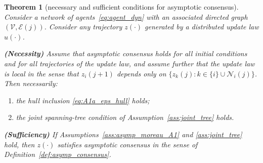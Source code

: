 \documentclass[10pt,a4paper]{amsart}
\newtheorem{theorem}{Theorem}
\begin{document}
\begin{theorem}[necessary and sufficient conditions for asymptotic consensus]
\label{thm:moreau_nes_suf}
Consider a network of agents~\eqref{eq:agent_dyn} with an associated directed graph $(\mathcal{V},\mathcal{E}(j))$.
Consider any trajectory $z(\cdot)$ generated by a distributed update law $u(\cdot)$.

\smallskip
\noindent\textbf{(Necessity)}  
Assume that asymptotic consensus holds for all initial conditions and for all trajectories of the update law,
and assume further that the update law is \emph{local} in the sense that $z_i(j+1)$ depends only on
$\{z_k(j):k\in\{i\}\cup\mathcal N_i(j)\}$.
Then necessarily:
\begin{enumerate}
\item[\textbf{(N1)}] the hull inclusion \eqref{eq:A1a_eps_hull} holds;
\item[\textbf{(N2)}] the joint spanning-tree condition of Assumption~\ref{ass:joint_tree} holds.
\end{enumerate}
\smallskip
\noindent\textbf{(Sufficiency)}  
If Assumptions~\ref{ass:asymp_moreau_A1} and \ref{ass:joint_tree} hold, then $z(\cdot)$ satisfies
asymptotic consensus in the sense of Definition~\ref{def:asymp_consensus}.
\end{theorem}
\end{document}
